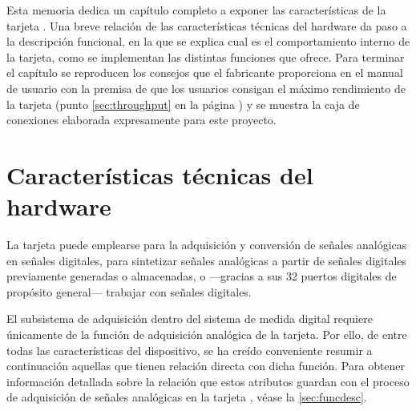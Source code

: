 Esta memoria dedica un capítulo completo a exponer las características de
la tarjeta \kpci{}. Una breve relación de las características técnicas del
hardware da paso a la descripción funcional, en la que se explica cual es
el comportamiento interno de la tarjeta, como se implementan las distintas
funciones que ofrece. Para terminar el capítulo se reproducen los consejos
que el fabricante proporciona en el manual de usuario con la premisa de que
los usuarios consigan el máximo rendimiento de la tarjeta (punto
\ref{sec:throughput} en la página \pageref{sec:throughput}) y se muestra la
caja de conexiones elaborada expresamente para este proyecto.


\section{Características técnicas del hardware}\label{sec:technical}

La tarjeta \kpci{} puede emplearse para la adquisición y conversión de
señales analógicas en señales digitales, para sintetizar señales analógicas
a partir de señales digitales previamente generadas o almacenadas, o
---gracias a sus 32 puertos digitales de propósito general--- trabajar con
señales digitales.

El subsistema de adquisición dentro del sistema de medida digital requiere
únicamente de la función de adquisición analógica de la tarjeta. Por ello,
de entre todas las características del dispositivo, se ha creído
conveniente resumir a continuación aquellas que tienen relación directa con
dicha función. Para obtener información detallada sobre la relación que
estos atributos guardan con el proceso de adquisición de señales analógicas
en la tarjeta \kpci{}, véase la \vref{sec:funcdesc}.

